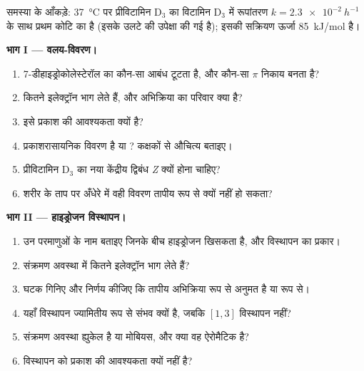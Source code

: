 \begin{problem}
\label{pb:b3:pericyclic:1}
समस्या के आँकड़े: \qty{37}{\celsius} पर प्रीविटामिन D$_3$ का विटामिन D$_3$ में रूपांतरण
$k = \qty{2.3e-2}{h^{-1}}$ के साथ प्रथम कोटि का है (इसके उलटे की उपेक्षा की गई है); इसकी सक्रियण ऊर्जा
\qty{85}{kJ/mol} है।

\medskip\noindent\textbf{भाग I --- वलय-विवरण।}
\begin{enumerate}
  \item 7-डीहाइड्रोकोलेस्टेरॉल का कौन-सा आबंध टूटता है, और कौन-सा $\pi$ निकाय बनता है?
  \item कितने इलेक्ट्रॉन भाग लेते हैं, और अभिक्रिया का परिवार क्या है?
  \item इसे प्रकाश की आवश्यकता क्यों है?
  \item प्रकाशरासायनिक विवरण  है या ? कक्षकों से
        औचित्य बताइए।
  \item प्रीविटामिन D$_3$ का नया केंद्रीय द्विबंध \textit{Z} क्यों होना चाहिए?
  \item शरीर के ताप पर अँधेरे में वही विवरण तापीय रूप से क्यों नहीं हो सकता?
\end{enumerate}

\medskip\noindent\textbf{भाग II --- हाइड्रोजन विस्थापन।}
\begin{enumerate}[resume]
  \item उन परमाणुओं के नाम बताइए जिनके बीच हाइड्रोजन खिसकता है, और विस्थापन का प्रकार।
  \item संक्रमण अवस्था में कितने इलेक्ट्रॉन भाग लेते हैं?
  \item घटक गिनिए और निर्णय कीजिए कि तापीय अभिक्रिया
         रूप से अनुमत है या  रूप से।
  \item यहाँ  विस्थापन ज्यामितीय रूप से संभव क्यों है, जबकि $[1,3]$ विस्थापन
        नहीं?
  \item संक्रमण अवस्था ह्युकेल है या मोबियस, और क्या वह ऐरोमैटिक है?
  \item विस्थापन को प्रकाश की आवश्यकता क्यों नहीं है?
\end{enumerate}


\end{problem}
